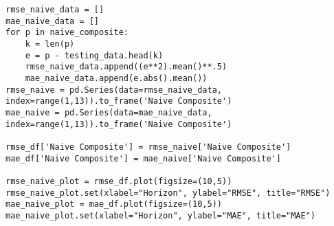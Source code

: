 \documentclass{article}
\begin{document}
\begin{lstlisting}
rmse_naive_data = []
mae_naive_data = []
for p in naive_composite:
	k = len(p)
	e = p - testing_data.head(k)
	rmse_naive_data.append((e**2).mean()**.5)
	mae_naive_data.append(e.abs().mean())
rmse_naive = pd.Series(data=rmse_naive_data, index=range(1,13)).to_frame('Naive Composite')
mae_naive = pd.Series(data=mae_naive_data, index=range(1,13)).to_frame('Naive Composite') 

rmse_df['Naive Composite'] = rmse_naive['Naive Composite']
mae_df['Naive Composite'] = mae_naive['Naive Composite']

rmse_naive_plot = rmse_df.plot(figsize=(10,5))
rmse_naive_plot.set(xlabel="Horizon", ylabel="RMSE", title="RMSE")
mae_naive_plot = mae_df.plot(figsize=(10,5))
mae_naive_plot.set(xlabel="Horizon", ylabel="MAE", title="MAE")

\end{lstlisting}
\end{document}
